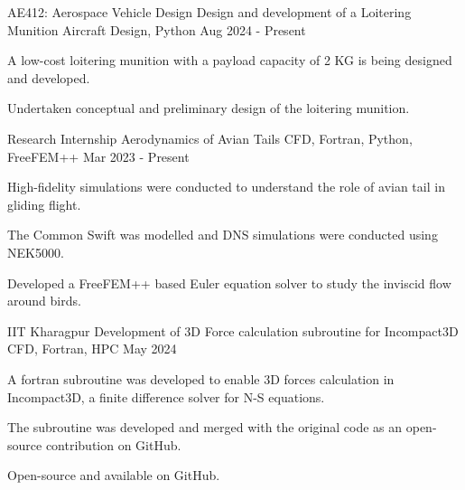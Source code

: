
\begin{cventries}
  \cventry
  {AE412: Aerospace Vehicle Design} %
  {Design and development of a Loitering Munition} %
  {Aircraft Design, Python} %
  {Aug 2024 - Present} %
  {
    \begin{cvitems} %
      \item {A low-cost loitering munition with a payload capacity of 2 KG is being designed and developed.}
      \item {Undertaken conceptual and preliminary design of the loitering munition.}
    \end{cvitems}
  }
  \cventry
  {Research Internship} %
  {Aerodynamics of Avian Tails} %
  {CFD, Fortran, Python, FreeFEM++} %
  {Mar 2023 - Present} %
  {
    \begin{cvitems} %
      \item {High-fidelity simulations were conducted to understand the role of avian tail in gliding flight.}
      \item {The Common Swift was modelled and DNS simulations were conducted using NEK5000.}
      \item {Developed a FreeFEM++ based Euler equation solver to study the inviscid flow around birds.}
    \end{cvitems}
  }
  
  \cventry
  {IIT Kharagpur} %
  {Development of 3D Force calculation subroutine for Incompact3D} %
  {CFD, Fortran, HPC} %
  {May 2024} %
  {
    \begin{cvitems} %
      \item {A fortran subroutine was developed to enable 3D forces calculation in Incompact3D, a finite difference solver for N-S equations.}
      \item {The subroutine was developed and merged with the original code as an open-source contribution on GitHub.}
      \item {Open-source and available on GitHub.}
    \end{cvitems}
  }


\end{cventries}

